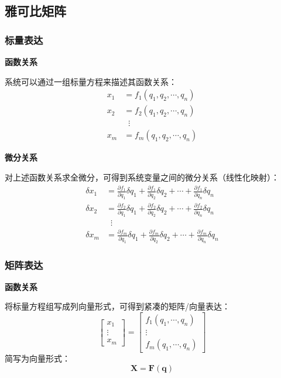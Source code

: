 \subsection{雅可比矩阵}
\subsubsection{标量表达}

\textbf{函数关系}

系统可以通过一组标量方程来描述其函数关系：
\begin{align*}
    x_1 &= f_1 (q_1, q_2, \cdots, q_n) \\
    x_2 &= f_2 (q_1, q_2, \cdots, q_n) \\
    &\;\;\vdots \\
    x_m &= f_m (q_1, q_2, \cdots, q_n)
\end{align*}

\textbf{微分关系}

对上述函数关系求全微分，可得到系统变量之间的微分关系（线性化映射）：
\begin{align*}
    \delta x_1 &= \frac{\partial f_1}{\partial q_1} \delta q_1 + \frac{\partial f_1}{\partial q_2} \delta q_2 + \cdots + \frac{\partial f_1}{\partial q_n} \delta q_n \\
    \delta x_2 &= \frac{\partial f_2}{\partial q_1} \delta q_1 + \frac{\partial f_2}{\partial q_2} \delta q_2 + \cdots + \frac{\partial f_2}{\partial q_n} \delta q_n \\
    &\;\;\vdots \\
    \delta x_m &= \frac{\partial f_m}{\partial q_1} \delta q_1 + \frac{\partial f_m}{\partial q_2} \delta q_2 + \cdots + \frac{\partial f_m}{\partial q_n} \delta q_n
\end{align*}

\subsubsection{矩阵表达}

\textbf{函数关系}

将标量方程组写成列向量形式，可得到紧凑的矩阵/向量表达：
\begin{equation*}
    \begin{bmatrix}
    x_1 \\ \vdots \\ x_m
    \end{bmatrix}
    =
    \begin{bmatrix}
    f_1(q_1, \cdots, q_n) \\
    \vdots \\
    f_m(q_1, \cdots, q_n)
    \end{bmatrix}
\end{equation*}
简写为向量形式：
\begin{equation}
    \boldsymbol{X} = \boldsymbol{F}(\boldsymbol{q})
\end{equation}

